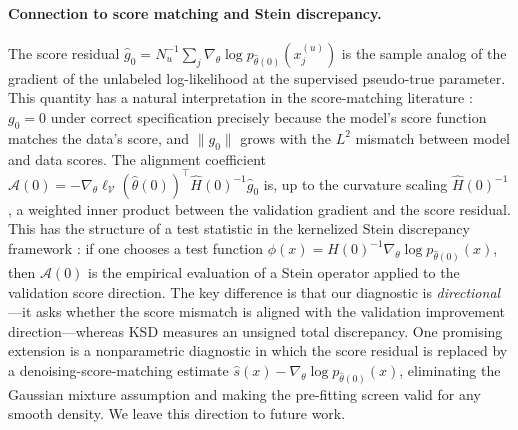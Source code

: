 \documentclass[11pt]{article}
\theoremstyle{definition}
\newcommand{\calV}{\mathcal{V}}
\newcommand{\calA}{\mathcal{A}}
\begin{document}
\paragraph{Connection to score matching and Stein discrepancy.}
The score residual \(\hat g_0 = N_u^{-1}\sum_j\nabla_\theta\log p_{\hat\theta(0)}(x_j^{(u)})\)
is the sample analog of the gradient of the unlabeled log-likelihood
at the supervised pseudo-true parameter.
This quantity has a natural interpretation in the score-matching literature
\citep{hyvarinen2005estimation}: \(g_0 = 0\) under correct specification
precisely because the model's score function matches the data's score,
and \(\|g_0\|\) grows with the \(L^2\) mismatch between model and data scores.
The alignment coefficient
\(\calA(0) = -\nabla_\theta\ell_\calV(\hat\theta(0))^\top\hat H(0)^{-1}\hat g_0\)
is, up to the curvature scaling \(\hat H(0)^{-1}\), a weighted inner product
between the validation gradient and the score residual.
This has the structure of a test statistic in the kernelized Stein discrepancy
framework \citep{liu2016kernelized}: if one chooses a test function
\(\phi(x) = \hat H(0)^{-1}\nabla_\theta\log p_{\hat\theta(0)}(x)\),
then \(\calA(0)\) is the empirical evaluation of a Stein operator applied to
the validation score direction.
The key difference is that our diagnostic is \emph{directional}---it asks
whether the score mismatch is aligned with the validation improvement
direction---whereas KSD measures an unsigned total discrepancy.
One promising extension is a nonparametric diagnostic in which the score
residual is replaced by a denoising-score-matching estimate
\(\hat s(x) - \nabla_\theta\log p_{\hat\theta(0)}(x)\), eliminating the
Gaussian mixture assumption and making the pre-fitting screen valid for
any smooth density.
We leave this direction to future work.
\end{document}
